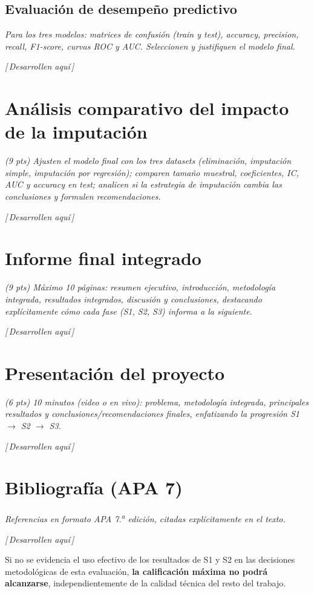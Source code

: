 \documentclass[11pt,a4paper]{article}
\newcommand{\guia}[1]{{\small\itshape\color{gris}#1}\par\vspace{0.15em}}
\newcommand{\resp}{{\footnotesize\itshape\color{fillgray}[\,Desarrollen aquí\,]}\par\vspace{1.1em}}
\begin{document}
\subsection{Evaluación de desempeño predictivo}
\guia{Para los tres modelos: matrices de confusión (train y test), accuracy, precision, recall, F1-score, curvas ROC y AUC. Seleccionen y justifiquen el modelo final.}
\resp

\section{Análisis comparativo del impacto de la imputación}
\guia{(9 pts) Ajusten el modelo final con los tres datasets (eliminación, imputación simple, imputación por regresión); comparen tamaño muestral, coeficientes, IC, AUC y accuracy en test; analicen si la estrategia de imputación cambia las conclusiones y formulen recomendaciones.}
\resp

\section{Informe final integrado}
\guia{(9 pts) Máximo 10 páginas: resumen ejecutivo, introducción, metodología integrada, resultados integrados, discusión y conclusiones, destacando explícitamente cómo cada fase (S1, S2, S3) informa a la siguiente.}
\resp

\section{Presentación del proyecto}
\guia{(6 pts) 10 minutos (video o en vivo): problema, metodología integrada, principales resultados y conclusiones/recomendaciones finales, enfatizando la progresión S1 $\to$ S2 $\to$ S3.}
\resp

\section{Bibliografía (APA 7)}
\guia{Referencias en formato APA 7.\textsuperscript{a} edición, citadas explícitamente en el texto.}
\resp

\begin{infobox}[Recordatorio]
Si no se evidencia el uso efectivo de los resultados de S1 y S2 en las decisiones metodológicas de esta evaluación, \textbf{la calificación máxima no podrá alcanzarse}, independientemente de la calidad técnica del resto del trabajo.
\end{infobox}
\end{document}
